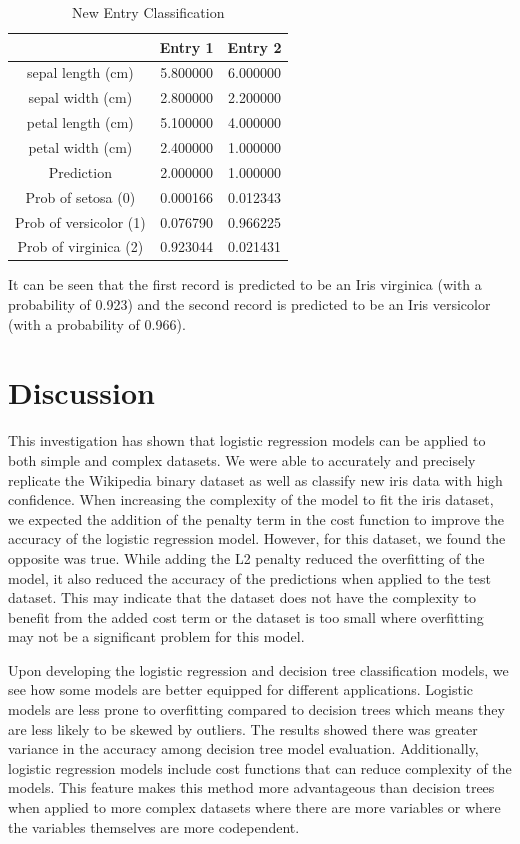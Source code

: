 \documentclass[journal]{IEEEtran}
\begin{document}
\begin{table}[h!]
\centering
\begin{tabular}{ c | c c }
 & Entry 1 &	Entry 2 \\ 
\hline
sepal length (cm)	& 5.800000	& 6.000000 \\
sepal width (cm)	& 2.800000	& 2.200000 \\
petal length (cm)	& 5.100000	& 4.000000 \\
petal width (cm)	& 2.400000	& 1.000000 \\
Prediction	& 2.000000	& 1.000000 \\
Prob of setosa (0)	& 0.000166	& 0.012343 \\
Prob of versicolor (1)	& 0.076790	& 0.966225 \\
Prob of virginica (2)	& 0.923044	& 0.021431
\end{tabular}
\caption{New Entry Classification}
\label{table:new-entry-table}
\end{table}

It can be seen that the first record is predicted to be an Iris virginica (with a probability of 0.923) and the second record is predicted to be an Iris versicolor (with a probability of 0.966).

\section{Discussion}

This investigation has shown that logistic regression models can be applied to both simple and complex datasets. We were able to accurately and precisely replicate the Wikipedia binary dataset as well as classify new iris data with high confidence. When increasing the complexity of the model to fit the iris dataset, we expected the addition of the penalty term in the cost function to improve the accuracy of the logistic regression model. However, for this dataset, we found the opposite was true. While adding the L2 penalty reduced the overfitting of the model, it also reduced the accuracy of the predictions when applied to the test dataset. This may indicate that the dataset does not have the complexity to benefit from the added cost term or the dataset is too small where overfitting may not be a significant problem for this model. 

Upon developing the logistic regression and decision tree classification models, we see how some models are better equipped for different applications. Logistic models are less prone to overfitting compared to decision trees which means they are less likely to be skewed by outliers. The results showed there was greater variance in the accuracy among decision tree model evaluation. Additionally, logistic regression models include cost functions that can reduce complexity of the models. This feature makes this method more advantageous than decision trees when applied to more complex datasets where there are more variables or where the variables themselves are more codependent. 
\end{document}

